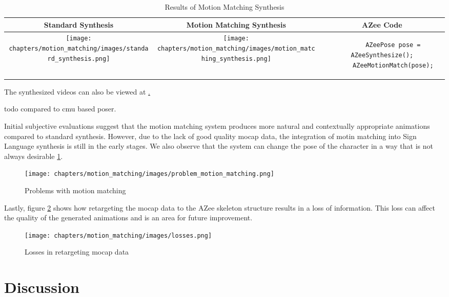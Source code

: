 \documentclass[../../main.tex]{subfiles}
\begin{document}
\begin{table}
  \centering
  \begin{tabular}{|c|c|c|}
    \hline
    \textbf{Standard Synthesis} & \textbf{Motion Matching Synthesis} & \textbf{AZee Code} \\
    \hline
    \texttt{[image: chapters/motion\_matching/images/standard\_synthesis.png]} & \texttt{[image: chapters/motion\_matching/images/motion\_matching\_synthesis.png]} & \begin{lstlisting}
      AZeePose pose = AZeeSynthesize();
      AZeeMotionMatch(pose);
    \end{lstlisting} \\
    \hline
  \end{tabular}
  \caption{Results of Motion Matching Synthesis}
  \label{tab:results}
\end{table}

The synthesized videos can also be viewed at \href{todo}.

todo compared to cmu based poser.

Initial subjective evaluations suggest that the motion matching system produces more natural and contextually appropriate animations compared to standard synthesis. However, due to the lack of good quality mocap data, the integration of motin matching into Sign Language synthesis is still in the early stages. We also observe that the system can change the pose of the character in a way that is not always desirable \ref{fig:problem_motion_matching}.

\begin{figure}
  \centering \texttt{[image: chapters/motion\_matching/images/problem\_motion\_matching.png]}
  \caption{Problems with motion matching}
  \label{fig:problem_motion_matching}
\end{figure}

Lastly, figure \ref{fig:losses} shows how retargeting the mocap data to the AZee skeleton structure results in a loss of information. This loss can affect the quality of the generated animations and is an area for future improvement.

\begin{figure}
  \centering \texttt{[image: chapters/motion\_matching/images/losses.png]}
  \caption{Losses in retargeting mocap data}
  \label{fig:losses}
\end{figure}

\section{Discussion}
\label{ch:motion_matching:discussion}
\end{document}

